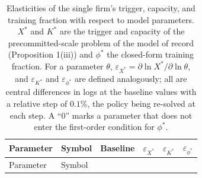 \documentclass[
  11pt,
  letterpaper,
]{scrartcl}
\begin{document}
\begin{longtable}[]{@{}
  >{\raggedright\arraybackslash}p{}
  >{\centering\arraybackslash}p{}
  >{\centering\arraybackslash}p{}
  >{\centering\arraybackslash}p{}
  >{\centering\arraybackslash}p{}
  >{\centering\arraybackslash}p{}@{}}
\caption{Elasticities of the single firm's trigger, capacity, and
training fraction with respect to model parameters. \(X^*\) and \(K^*\)
are the trigger and capacity of the precommitted-scale problem of the
model of record (Proposition 1(iii)) and \(\phi^*\) the closed-form
training fraction. For a parameter \(\theta\),
\(\varepsilon_{X^*} = \partial \ln X^* / \partial \ln \theta\), and
\(\varepsilon_{K^*}\) and \(\varepsilon_{\phi^*}\) are defined
analogously; all are central differences in logs at the baseline values
with a relative step of \(0.1\%\), the policy being re-solved at each
step. A ``\(0\)'' marks a parameter that does not enter the first-order
condition for \(\phi^*\).}\label{tbl-elasticities}\tabularnewline
\toprule\noalign{}
\begin{minipage}[b]{\linewidth}\raggedright
Parameter
\end{minipage} & \begin{minipage}[b]{\linewidth}\centering
Symbol
\end{minipage} & \begin{minipage}[b]{\linewidth}\centering
Baseline
\end{minipage} & \begin{minipage}[b]{\linewidth}\centering
\(\varepsilon_{X^*}\)
\end{minipage} & \begin{minipage}[b]{\linewidth}\centering
\(\varepsilon_{K^*}\)
\end{minipage} & \begin{minipage}[b]{\linewidth}\centering
\(\varepsilon_{\phi^*}\)
\end{minipage} \\
\midrule\noalign{}
\endfirsthead
\toprule\noalign{}
\begin{minipage}[b]{\linewidth}\raggedright
Parameter
\end{minipage} & \begin{minipage}[b]{\linewidth}\centering
Symbol
\end{minipage} & \begin{minipage}[b]{\linewidth}\centering

\end{minipage}
\end{longtable}
\end{document}
